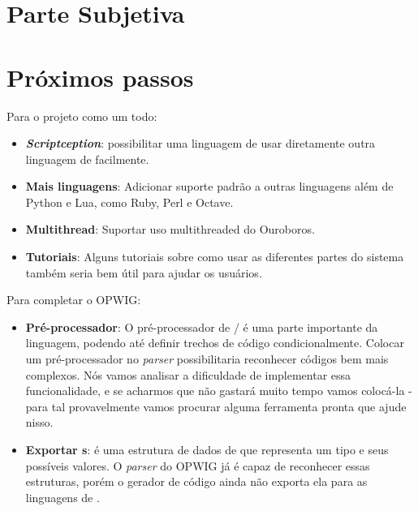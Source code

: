 \chapter*{Parte Subjetiva}
\label{sec:parte_subjetiva}

\newcommand\materia[3]{\noindent \textbf{#1} - \texttt{#2}\\\indent #3\vspace{0.5cm}\\}





\chapter{Próximos passos}
\label{sec:proximos_passos}

Para o projeto como um todo:
\begin{itemize}
  \item \emph{\textbf{Scriptception}}: possibilitar uma linguagem de \script{} usar diretamente
    outra linguagem de \script{} facilmente.
  \item \textbf{Mais linguagens}: Adicionar suporte padrão a outras linguagens além de Python e Lua,
    como Ruby, Perl e Octave.
  \item \textbf{Multithread}: Suportar uso multithreaded do Ouroboros.
  \item \textbf{Tutoriais}: Alguns tutoriais sobre como usar as diferentes partes do
    sistema também seria bem útil para ajudar os usuários.
\end{itemize}

Para completar o OPWIG:
\begin{itemize}
  \item \textbf{Pré-processador}: O pré-processador de \C{}/\CXX{} é uma parte 
    importante da linguagem, podendo até definir trechos de código condicionalmente.
    Colocar um pré-processador no \textit{parser} possibilitaria reconhecer
    códigos \CXX{} bem mais complexos. Nós vamos analisar a dificuldade de implementar
    essa funcionalidade, e se acharmos que não gastará muito tempo vamos colocá-la -
    para tal provavelmente vamos procurar alguma ferramenta pronta que ajude nisso.
  \item \textbf{Exportar s}:  é uma estrutura de dados de \CXX{} 
    que representa um tipo e seus possíveis valores. O \textit{parser} do OPWIG já
    é capaz de reconhecer essas estruturas, porém o gerador de código ainda não
    exporta ela para as linguagens de \script{}.
\end{itemize}
